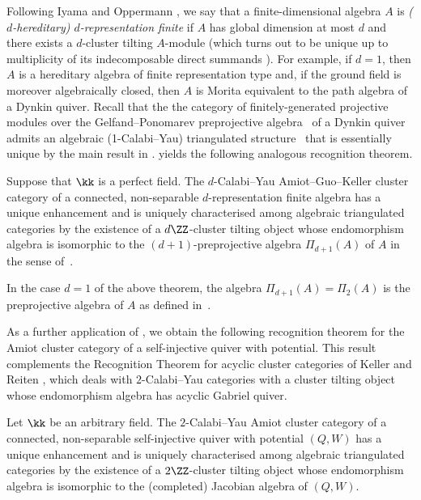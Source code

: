 \documentclass[a4paper]{amsart}
\begin{document}
Following Iyama and Oppermann \cite{IO11}, we say that a finite-dimensional
algebra $A$ is \emph{($d$-hereditary) $d$-representation finite} if $A$ has
global dimension at most $d$ and there exists a $d$-cluster tilting $A$-module
(which turns out to be unique up to multiplicity of its indecomposable direct
summands \cite{Iya11}). For example, if $d=1$, then $A$ is a hereditary algebra
of finite representation type and, if the ground field is moreover algebraically
closed, then $A$ is Morita equivalent to the path algebra of a Dynkin quiver.
Recall that the the category of finitely-generated projective
modules over the Gelfand--Ponomarev preprojective algebra~\cite{GP79} of a Dynkin quiver
admits an algebraic (1-Calabi--Yau) triangulated structure~\cite{AR96} that is essentially unique by the main result in \cite{Mur22}.
 yields the
following analogous recognition theorem.

\begin{theorem*}
  Suppose that $\kk$ is a perfect field. The $d$-Calabi--Yau Amiot--Guo--Keller
  cluster category of a connected, non-separable $d$-representation finite
  algebra has a unique enhancement and is uniquely characterised among algebraic
  triangulated categories by the existence of a $d\ZZ$-cluster tilting object
  whose endomorphism algebra is isomorphic to the $(d+1)$-preprojective algebra
  $\Pi_{d+1}(A)$ of $A$ in the sense of~\cite{IO13}.
\end{theorem*}

In the case $d=1$ of the above theorem, the algebra $\Pi_{d+1}(A)=\Pi_2(A)$ is
the preprojective algebra of $A$ as defined in~\cite{BGL87}.

As a further application of , we obtain
the following recognition theorem for the Amiot cluster category of a
self-injective quiver with potential. This result complements the Recognition
Theorem for acyclic cluster categories of Keller and Reiten \cite{KR08}, which
deals with $2$-Calabi--Yau categories with a cluster tilting object whose
endomorphism algebra has acyclic Gabriel quiver.

\begin{theorem*}
  Let $\kk$ be an arbitrary field. The $2$-Calabi--Yau Amiot cluster category of
  a connected, non-separable self-injective quiver with potential $(Q,W)$ has a
  unique enhancement and is uniquely characterised among algebraic triangulated
  categories by the existence of a $2\ZZ$-cluster tilting object whose
  endomorphism algebra is isomorphic to the (completed) Jacobian algebra of
  $(Q,W)$.
\end{theorem*}
\end{document}
